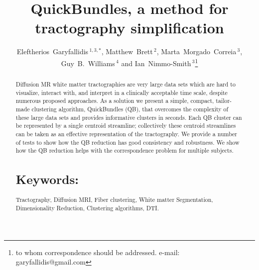 \documentclass{bioinfo}
\begin{document}

\title[QuickBundles]{QuickBundles, a method for tractography simplification}

\author[Garyfallidis, Brett, Correia, Williams and
Nimmo-Smith]{Eleftherios~Garyfallidis\,$^{1,3,*}$, Matthew~Brett\,$^{2}$,
  Marta~Morgado~Correia\,$^{3}$, Guy~B.~Williams\,$^{4}$ and
  Ian~Nimmo-Smith\,$^{3}$\footnote{to whom correspondence should be
    addressed. e-mail: garyfallidis@gmail.com}}

\address{\,$^{1}$Wolfson College, University of Cambridge, Cambridge, UK\\
  \,$^{2}$University of California, Henry H. Wheeler, Jr. Brain Imaging Center, Berkeley, CA.\\
  \,$^{3}$MRC Cognition and Brain Sciences Unit, Cambridge, UK.\\
  \,$^{4}$Wolfson Brain Imaging Centre, University of Cambridge,
  Cambridge, UK.}


\history{}

\editor{}

\maketitle

\begin{abstract}
\noindent
Diffusion MR white matter tractographies are very large data sets which
are hard to visualize, interact with, and interpret in a clinically
acceptable time scale, despite numerous proposed approaches. As a
solution we present a simple, compact, tailor-made clustering algorithm,
QuickBundles (QB), that overcomes the complexity of these large data
sets and provides informative clusters in seconds. Each QB cluster can
be represented by a single centroid streamline; collectively these
centroid streamlines can be taken as an effective representation of the
tractography. We provide a number of tests to show how the QB reduction
has good consistency and robustness. We show how the QB reduction helps
with the correspondence problem for multiple subjects.


\section{Keywords:} Tractography, Diffusion MRI, Fiber clustering, White
matter Segmentation, Dimensionality Reduction, Clustering algorithms, DTI.

\end{abstract}
\end{document}
